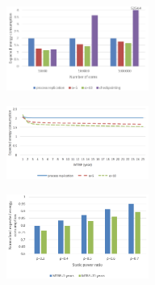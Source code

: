 \documentclass[landscape,final,a0paper,fontscale=0.285]{baposter}
\begin{document}
\begin{poster}
{\begin{multicols}{2}
        \vspace{3pt}
        

        \includegraphics[width=0.35\textwidth]{images/ne5.png} 
        
        \includegraphics[width=0.35\textwidth]{images/e32.png} 
        \vspace{3pt}

        
        \includegraphics[width=0.35\textwidth]{images/s_power_5.png} 
        

\end{multicols}}
\end{poster}
\end{document}
